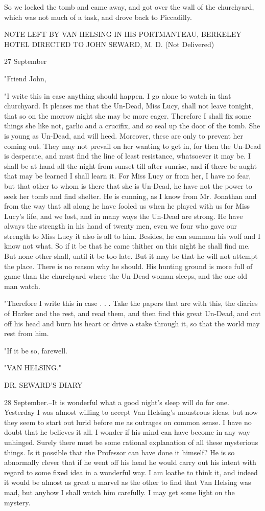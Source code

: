 So we locked the tomb and came away, and got over the wall of the churchyard, which was not much of a task, and drove back to Piccadilly. 

NOTE LEFT BY VAN HELSING IN HIS PORTMANTEAU, BERKELEY HOTEL DIRECTED TO JOHN SEWARD, M. D. (Not Delivered) 

27 September 

"Friend John, 

"I write this in case anything should happen. I go alone to watch in that churchyard. It pleases me that the Un-Dead, Miss Lucy, shall not leave tonight, that so on the morrow night she may be more eager. Therefore I shall fix some things she like not, garlic and a crucifix, and so seal up the door of the tomb. She is young as Un-Dead, and will heed. Moreover, these are only to prevent her coming out. They may not prevail on her wanting to get in, for then the Un-Dead is desperate, and must find the line of least resistance, whatsoever it may be. I shall be at hand all the night from sunset till after sunrise, and if there be aught that may be learned I shall learn it. For Miss Lucy or from her, I have no fear, but that other to whom is there that she is Un-Dead, he have not the power to seek her tomb and find shelter. He is cunning, as I know from Mr. Jonathan and from the way that all along he have fooled us when he played with us for Miss Lucy's life, and we lost, and in many ways the Un-Dead are strong. He have always the strength in his hand of twenty men, even we four who gave our strength to Miss Lucy it also is all to him. Besides, he can summon his wolf and I know not what. So if it be that he came thither on this night he shall find me. But none other shall, until it be too late. But it may be that he will not attempt the place. There is no reason why he should. His hunting ground is more full of game than the churchyard where the Un-Dead woman sleeps, and the one old man watch. 

"Therefore I write this in case . . . Take the papers that are with this, the diaries of Harker and the rest, and read them, and then find this great Un-Dead, and cut off his head and burn his heart or drive a stake through it, so that the world may rest from him. 

"If it be so, farewell. 

"VAN HELSING." 

DR. SEWARD'S DIARY 

28 September.--It is wonderful what a good night's sleep will do for one. Yesterday I was almost willing to accept Van Helsing's monstrous ideas, but now they seem to start out lurid before me as outrages on common sense. I have no doubt that he believes it all. I wonder if his mind can have become in any way unhinged. Surely there must be some rational explanation of all these mysterious things. Is it possible that the Professor can have done it himself? He is so abnormally clever that if he went off his head he would carry out his intent with regard to some fixed idea in a wonderful way. I am loathe to think it, and indeed it would be almost as great a marvel as the other to find that Van Helsing was mad, but anyhow I shall watch him carefully. I may get some light on the mystery. 

